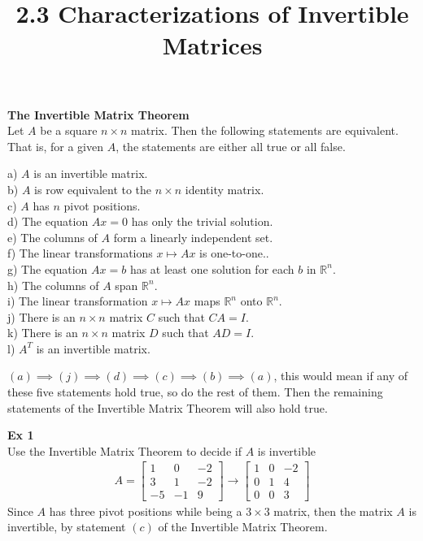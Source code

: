 \documentclass{article}
\title{2.3 Characterizations of Invertible Matrices}
\begin{document}
    \maketitle
    \textbf{The Invertible Matrix Theorem}\\
    Let $ A $ be a square $ n \times n $ matrix. Then the following statements are equivalent. That is, for a given $ A $, the statements are either all true or all false.

    a) $ A $ is an invertible matrix.\\
    b) $ A $ is row equivalent to the $ n \times n $ identity matrix.\\
    c) $ A $ has $ n $ pivot positions.\\
    d) The equation $ Ax=0 $ has only the trivial solution.\\
    e) The columns of $ A $ form a linearly independent set.\\
    f) The linear transformations $ x \mapsto Ax $ is one-to-one..\\
    g) The equation $ Ax=b $ has at least one solution for each $ b $ in $ \mathbb{R}^{n}  $.\\
    h) The columns of $ A $ span $ \mathbb{R}^{n}  $.\\
    i) The linear transformation $ x \mapsto Ax $ maps $ \mathbb{R}^{n}  $ onto $ \mathbb{R}^{n}  $.\\
    j) There is an $ n \times n $ matrix $ C $ such that $ CA=I $.\\
    k) There is an $ n \times n $ matrix $ D $ such that $ AD=I $.\\
    l) $ A^{T}  $ is an invertible matrix.

    $ (a) \implies (j) \implies (d) \implies (c) \implies (b) \implies (a) $, this would mean if any of these five statements hold true, so do the rest of them. Then the remaining statements of the Invertible Matrix Theorem will also hold true.

    \textbf{Ex 1}\\
    Use the Invertible Matrix Theorem to decide if $ A $ is invertible
    \[
        \begin{gathered}
        A = \begin{bmatrix}
            1 &0 &-2\\
            3 &1 &-2\\
            -5 &-1 &9
        \end{bmatrix}\to 
        \begin{bmatrix}
            1 &0 &-2\\
            0 &1 &4\\
            0 &0 &3
        \end{bmatrix}
        \end{gathered}
    \]
    Since $ A $ has three pivot positions while being a $ 3 \times 3 $ matrix, then the matrix $ A $ is invertible, by statement $ (c) $ of the Invertible Matrix Theorem.
\end{document}
